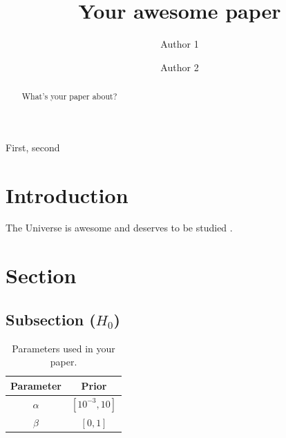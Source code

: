 \documentclass[12pt]{openjournal}
\begin{document}
\title{Your awesome paper}


\author{Author 1}

\author{Author 2}



\begin{abstract}
    What's your paper about?
    \lipsum[50]
\end{abstract}

\begin{keywords}
    {First, second}
\end{keywords}

\maketitle


\section{Introduction}
\label{sec:intro}

The Universe is awesome and deserves to be studied \cite{me}.

\lipsum[10]


\section{Section}
\label{sec:sec}

\lipsum[12]

\subsection{Subsection  (\texorpdfstring{$ H_0 $}{})}

\begingroup %
    \setlength{\tabcolsep}{10pt} %
    \renewcommand{\arraystretch}{1.5} %
    \begin{table}
        \centering
        \begin{tabular}{ c c }  
            Parameter & Prior \\
            \hline \hline     
            {\boldmath$\alpha$} & $\left[ 10^{-3}, 10 \right]$ \\
            {\boldmath$\beta$} & $\left[ 0, 1 \right]$ \\   
            \hline \hline  
        \end{tabular}  
        \caption{Parameters used in your paper.}
        \label{table:table}
    \end{table}
\endgroup
\end{document}
